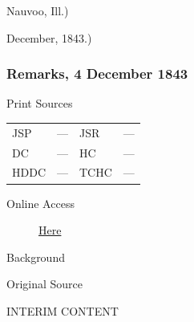				Nauvoo, Ill.)

				December, 1843.)
				
		\subsubsection{Remarks, 4 December 1843}
			\label{EMS-1843-JS-4-DEC-1843}
		
			\begin{description}
				\item[Print Sources]
			\end{description}

				\begin{tabular}{p{0.5in}p{1in}p{0.5in}p{1in}}
				JSP	 	& ---		& JSR 		& --- \\
				DC	 	& ---		& HC 		& --- \\
				HDDC 	& ---		& TCHC 		& --- \\
				\end{tabular}
			
			\begin{description}
				\item[Online Access] \href{https://www.josephsmithpapers.org/paper-summary/minutes-4-december-1843/1}{Here}
			\end{description}
			
			\begin{description}
				\item[Background]
			\end{description}
			
			
			\begin{description}
				\item[Original Source]
			\end{description}
			
				INTERIM CONTENT
			
			
